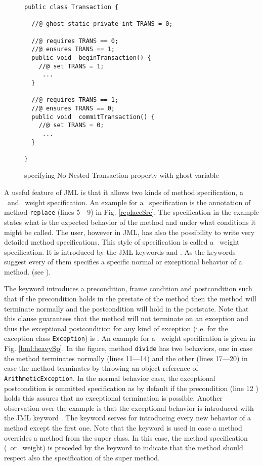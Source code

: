 \begin{figure}[ht!]
\begin{lstlisting}[frame=trbl] 
public class Transaction {

  //@ ghost static private int TRANS = 0; 
  
  //@ requires TRANS == 0;
  //@ ensures TRANS == 1;
  public void  beginTransaction() {
    //@ set TRANS = 1;
     ...
  }

  //@ requires TRANS == 1;
  //@ ensures TRANS == 0;
  public void  commitTransaction() {
    //@ set TRANS = 0; 
     ...
  }
  
}
\end{lstlisting}
\caption{\sc specifying No Nested Transaction property with ghost variable} 
\label{bml:ghost}
\end{figure}

A useful feature of JML is that it allows two kinds of method specification, a \light  \ and \heavy \ weight specification. 
An example for a \light \  specification is the annotation of method \texttt{replace} (lines 5---9) in Fig. \ref{replaceSrc}. The specification in 
the example states what is the expected behavior of the method and under what conditions it might be called.
The user, however in JML, has also the possibility
to write very detailed method specifications. This style of specification is called a \heavy  \ weight specification.
 It is introduced by the JML keywords  and . As the keywords
suggest every of them specifies a specific normal or exceptional behavior of a method.  (see \cite{PD06LBR}). 

The keyword   introduces a precondition, frame condition and postcondition 
such that if the precondition holds in the prestate of the
 method then the method will terminate normally and the postcondition will hold in the poststate.
 Note that this clause guarantees that the method will not terminate on an exception and thus the exceptional postcondition 
for any kind of exception (i.e. for the exception class  \texttt{Exception}) is  .
An example for a \heavy \ weight specification is given in Fig. \ref{bml:heavySp}. In the figure, method \texttt{divide} has 
two behaviors, one in case the method terminates normally (lines 11---14) and the other (lines 17---20) in case the method
 terminates by throwing an object reference of \texttt{ArithmeticException}.
 In the normal behavior case, the exceptional postcondition is ommitted  specification as by default if the precondition (line 12 )
 holds this assures that no exceptional
 termination is possible. Another observation over the example is that the exceptional behavior is introduced with the JML keyword . 
 The keyword   serves for introducing every new behavior of a method except the first one. Note that the keyword  
 is used in case a  method overrides a method from the super class. In this case, the method specification (\heavy \ or \light \ weight) is preceded by the keyword  
 to indicate that the method should respect also the specification of the super method.


